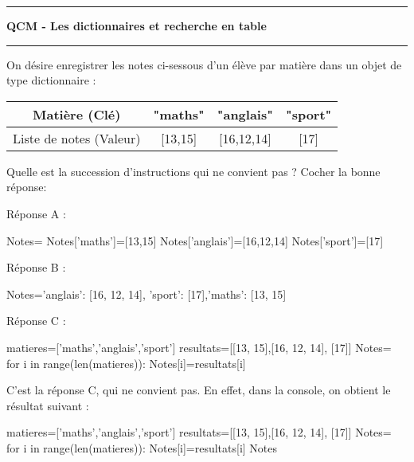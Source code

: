\documentclass[a4paper,12,%
]{exam}
\begin{document}
\chead{}

\lfoot{                      }
\hrule
\begin{center}
	\textbf{\Large{QCM - Les dictionnaires et recherche en table }}\end{center}
\hrule
\vskip0.5cm
	\begin{questions}
		\question On désire enregistrer les notes ci-sessous d'un élève par matière dans un objet de type dictionnaire : 
		\begin{center}
		\begin{tabular}{|c|c|c|c|}
		\hline
		Matière (Clé) & "maths"&"anglais"&"sport"\\
		\hline
		 Liste de notes (Valeur)&[13,15] &[16,12,14]&[17]\\
		 \hline
		\end{tabular}
	\end{center}
		Quelle est la succession d'instructions qui ne convient pas ?
		Cocher la bonne réponse:
		\begin{checkboxes}
			\choice Réponse A : 
\begin{pyverbatim}
Notes={}
Notes['maths']=[13,15]
Notes['anglais']=[16,12,14]
Notes['sport']=[17]
\end{pyverbatim}
\choice Réponse B :
\begin{pyverbatim}
Notes={'anglais': [16, 12, 14], 'sport': [17],'maths': [13, 15]}
\end{pyverbatim}
\choice Réponse C :
\begin{pyverbatim}
matieres=['maths','anglais','sport']
resultats=[[13, 15],[16, 12, 14], [17]]
Notes={}
for i in range(len(matieres)):
	Notes[i]=resultats[i]
\end{pyverbatim}
\end{checkboxes}		

\begin{solution}
C'est la réponse C, qui ne convient pas. En effet, dans la console, on obtient le résultat suivant :
\begin{pyconsole}
matieres=['maths','anglais','sport']
resultats=[[13, 15],[16, 12, 14], [17]]
Notes={}
for i in range(len(matieres)):
	Notes[i]=resultats[i]
Notes
\end{pyconsole}
\end{solution}


\end{questions}
\end{document}
